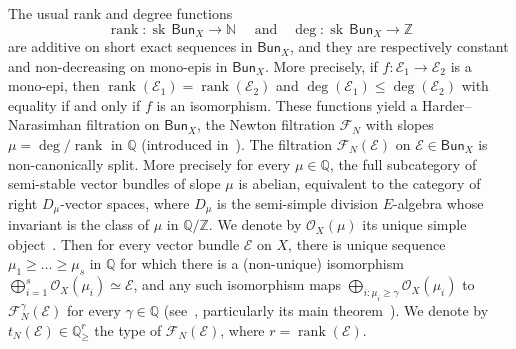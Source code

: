 \documentclass[11pt]{article}
\theoremstyle{definition}
\numberwithin{equation}{section}
\numberwithin{figure}{section}
\numberwithin{table}{section}
\newcommand{\Bun}{\mathsf{Bun}}
\DeclareMathOperator{\rank}{rank}
\DeclareMathOperator{\sk}{sk}
\begin{document}
The usual rank and degree functions
\[
\rank:\sk\,\Bun_{X}\rightarrow\mathbb{N}\quad\text{ and}\quad\deg:\sk\,\Bun_{X}\rightarrow\mathbb{Z}
\]
are additive on short exact sequences in $\Bun_{X}$, and they are respectively constant and non-decreasing on mono-epis in $\Bun_{X}$. More precisely, if $f:\mathcal{E}_{1}\rightarrow\mathcal{E}_{2}$ is a mono-epi, then $\rank(\mathcal{E}_{1})=\rank(\mathcal{E}_{2})$ and $\deg(\mathcal{E}_{1})\leq\deg(\mathcal{E}_{2})$ with equality if and only if $f$ is an isomorphism. These functions yield a Harder--Narasimhan filtration on $\Bun_{X}$, the Newton filtration $\mathcal{F}_{N}$ with slopes $\mu=\deg/\rank$ in $\mathbb{Q}$ (introduced in~\cite[5.5]{FaFo15}). The filtration $\mathcal{F}_{N}(\mathcal{E})$ on $\mathcal{E}\in\Bun_{X}$ is non-canonically split. More precisely for every $\mu\in\mathbb{Q}$, the full subcategory of semi-stable vector bundles of slope $\mu$ is abelian, equivalent to the category of right $D_{\mu}$-vector spaces, where $D_{\mu}$ is the semi-simple division $E$-algebra whose invariant is the class of $\mu$ in $\mathbb{Q}/\mathbb{Z}$. We denote by $\mathcal{O}_{X}(\mu)$ its unique simple object~\cite[5.6.22]{FaFo15}. Then for every vector bundle $\mathcal{E}$ on $X$, there is unique sequence $\mu_{1}\geq\dots\geq\mu_{s}$ in $\mathbb{Q}$ for which there is a (non-unique) isomorphism $\bigoplus_{i=1}^{s}\mathcal{O}_{X}(\mu_{i})\simeq\mathcal{E}$, and any such isomorphism maps $\bigoplus_{i:\mu_{i}\geq\gamma}\mathcal{O}_{X}(\mu_{i})$ to $\mathcal{F}_{N}^{\gamma}(\mathcal{E})$ for every $\gamma\in\mathbb{Q}$ (see~\cite[Chapter~$8$]{FaFo15}, particularly its main theorem~\cite[8.2.10]{FaFo15}). We denote by $t_{N}(\mathcal{E})\in\mathbb{Q}_{\geq}^{r}$ the type of $\mathcal{F}_{N}(\mathcal{E})$, where $r=\rank(\mathcal{E})$.
\end{document}
